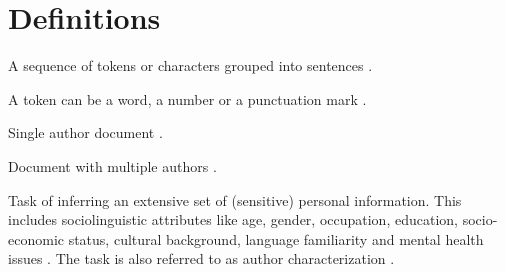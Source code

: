 \section{Definitions}
\label{sec:definitions}



\begin{definition}
    [Text]
    A sequence of tokens or characters grouped into sentences \cite{elmanarelbouanani_authorship_2014}.
\end{definition}

\begin{definition}
    [Token]
    A token can be a word, a number or a punctuation mark \cite{elmanarelbouanani_authorship_2014}.
\end{definition}

\begin{definition}
    [Monograph]
    Single author document \cite{bevendorff_smauc_2023}.
\end{definition}

\begin{definition}
    Document with multiple authors \cite{bevendorff_smauc_2023}.
\end{definition}

\begin{definition}
    Task of inferring an extensive set of (sensitive) personal information.
    This includes sociolinguistic attributes like age, gender, occupation, education, socio-economic status, cultural background, 
    language familiarity and mental health issues 
    \cite{emmery_adversarial_2021,stamatatos_survey_2009,elmanarelbouanani_authorship_2014}.
    The task is also referred to as author characterization \cite{stamatatos_survey_2009,elmanarelbouanani_authorship_2014}.
\end{definition}

